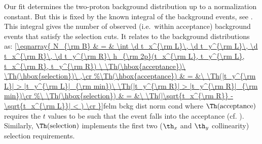 

Our fit  determines the two-proton background distribution  up to a normalization constant. But this is fixed by the known integral of the background events, see . This integral gives the number of observed (i.e.~within acceptance) background events that satisfy the selection cuts. It relates to the background distributions as:
\eqref{\eqnarray{
N_{\rm B} & = & \int \d t_x^{\rm L}\, \d t_y^{\rm L}\, \d t_x^{\rm R}\, \d t_y^{\rm R}\ h_{\rm 2p}(t_x^{\rm L}, t_y^{\rm L}, t_x^{\rm R}, t_y^{\rm R})
	\ \Th(\hbox{acceptance})\ \Th(\hbox{selection})\ ,\cr
}}{felm bckg dist norm cond}
where $\Th(\hbox{acceptance})$ requires the $t$ values to be such that the event falls into the acceptance (cf. ). Similarly, $\Th(\hbox{selection})$ implements the first two ($\th_x$ and $\th_y$ collinearity) selection requirements.

